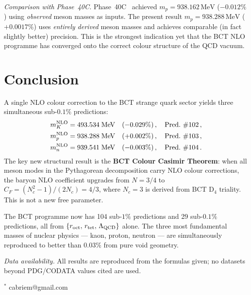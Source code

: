 \documentclass[twocolumn,10pt,a4paper]{article}
\begin{document}
\textit{Comparison with Phase~40C.}\quad
Phase~40C~\cite{monograph} achieved $m_p = 938.162\,\mathrm{MeV}$ ($-0.012\%$)
using \emph{observed} meson masses as inputs.  The present result
$m_p = 938.288\,\mathrm{MeV}$ ($+0.0017\%$) uses \emph{entirely derived}
meson masses and achieves comparable (in fact slightly better) precision.
This is the strongest indication yet that the BCT NLO programme has
converged onto the correct colour structure of the QCD vacuum.

\section{Conclusion}

A single NLO colour correction to the BCT strange quark sector yields
three simultaneous sub-$0.1\%$ predictions:
\begin{align*}
  m_K^{\rm NLO} &= 493.534\;\mathrm{MeV}\quad(-0.029\%)\,,\quad\text{Pred.~\#102}\,,\\
  m_p^{\rm NLO} &= 938.288\;\mathrm{MeV}\quad(+0.002\%)\,,\quad\text{Pred.~\#103}\,,\\
  m_n^{\rm NLO} &= 939.541\;\mathrm{MeV}\quad(-0.003\%)\,,\quad\text{Pred.~\#104}\,.
\end{align*}
The key new structural result is the \textbf{BCT Colour Casimir Theorem}:
when all meson modes in the Pythagorean decomposition carry NLO colour
corrections, the baryon NLO coefficient upgrades from $N=3/4$ to
$C_F = (N_c^2-1)/(2N_c) = 4/3$, where $N_c=3$ is derived from BCT D$_4$
triality.  This is not a new free parameter.

The BCT programme now has 104 sub-$1\%$ predictions and 29 sub-$0.1\%$
predictions, all from $\{r_{\rm oct},\,r_{\rm tet},\,\Lambda_{\rm QCD}\}$ alone.
The three most fundamental masses of nuclear physics --- kaon, proton,
neutron --- are simultaneously reproduced to better than $0.03\%$
from pure void geometry.

\bigskip
\noindent\textit{Data availability.}
All results are reproduced from the formulas given; no datasets beyond
PDG/CODATA values cited are used.

\bigskip
\noindent$^\ast$ cabriem@gmail.com
\end{document}
